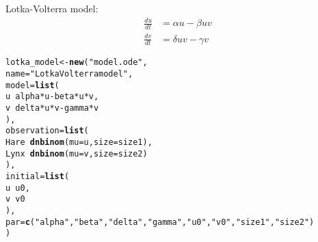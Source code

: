 \documentclass{article}\usepackage[]{graphicx}\usepackage[]{color}
\makeatletter
\newcommand{\hlstr}[1]{\textcolor[rgb]{0.192,0.494,0.8}{#1}}%
\newcommand{\hlopt}[1]{\textcolor[rgb]{0,0,0}{#1}}%
\newcommand{\hlstd}[1]{\textcolor[rgb]{0.345,0.345,0.345}{#1}}%
\newcommand{\hlkwb}[1]{\textcolor[rgb]{0.69,0.353,0.396}{#1}}%
\newcommand{\hlkwc}[1]{\textcolor[rgb]{0.333,0.667,0.333}{#1}}%
\newcommand{\hlkwd}[1]{\textcolor[rgb]{0.737,0.353,0.396}{\textbf{#1}}}%
\newenvironment{kframe}{%
 \def\at@end@of@kframe{}%
 \ifinner\ifhmode%
  \def\at@end@of@kframe{\end{minipage}}%
  \begin{minipage}{\columnwidth}%
 \fi\fi%
 \def\FrameCommand##1{\hskip\@totalleftmargin \hskip-\fboxsep
 \colorbox{shadecolor}{##1}\hskip-\fboxsep
     \hskip-\linewidth \hskip-\@totalleftmargin \hskip\columnwidth}%
 \MakeFramed {\advance\hsize-\width
   \@totalleftmargin\z@ \linewidth\hsize
   \@setminipage}}%
 {\par\unskip\endMakeFramed%
 \at@end@of@kframe}
\newenvironment{knitrout}{}{} %
\makeatother
\begin{document}
Lotka-Volterra model:
\begin{equation}
\begin{aligned}
\frac{du}{dt} &= \alpha u - \beta uv\\
\frac{dv}{dt} &= \delta uv - \gamma v
\end{aligned}
\end{equation}
\begin{knitrout}
\color{fgcolor}\begin{kframe}
\begin{alltt}
\hlstd{lotka_model} \hlkwb{<-} \hlkwd{new}\hlstd{(}\hlstr{"model.ode"}\hlstd{,}
    \hlkwc{name}\hlstd{=}\hlstr{"Lotka Volterra model"}\hlstd{,}
    \hlkwc{model}\hlstd{=}\hlkwd{list}\hlstd{(}
        \hlstd{u} \hlopt{~} \hlstd{alpha} \hlopt{*} \hlstd{u} \hlopt{-} \hlstd{beta} \hlopt{*} \hlstd{u} \hlopt{*} \hlstd{v,}
        \hlstd{v} \hlopt{~} \hlstd{delta} \hlopt{*} \hlstd{u} \hlopt{*} \hlstd{v} \hlopt{-} \hlstd{gamma} \hlopt{*} \hlstd{v}
    \hlstd{),}
    \hlkwc{observation}\hlstd{=}\hlkwd{list}\hlstd{(}
        \hlstd{Hare} \hlopt{~} \hlkwd{dnbinom}\hlstd{(}\hlkwc{mu}\hlstd{=u,} \hlkwc{size}\hlstd{=size1),}
        \hlstd{Lynx} \hlopt{~} \hlkwd{dnbinom}\hlstd{(}\hlkwc{mu}\hlstd{=v,} \hlkwc{size}\hlstd{=size2)}
    \hlstd{),}
    \hlkwc{initial}\hlstd{=}\hlkwd{list}\hlstd{(}
        \hlstd{u} \hlopt{~} \hlstd{u0,}
        \hlstd{v} \hlopt{~} \hlstd{v0}
    \hlstd{),}
    \hlkwc{par}\hlstd{=}\hlkwd{c}\hlstd{(}\hlstr{"alpha"}\hlstd{,} \hlstr{"beta"}\hlstd{,} \hlstr{"delta"}\hlstd{,} \hlstr{"gamma"}\hlstd{,} \hlstr{"u0"}\hlstd{,} \hlstr{"v0"}\hlstd{,} \hlstr{"size1"}\hlstd{,} \hlstr{"size2"}\hlstd{)}
\hlstd{)}
\end{alltt}
\end{kframe}
\end{knitrout}
\end{document}
